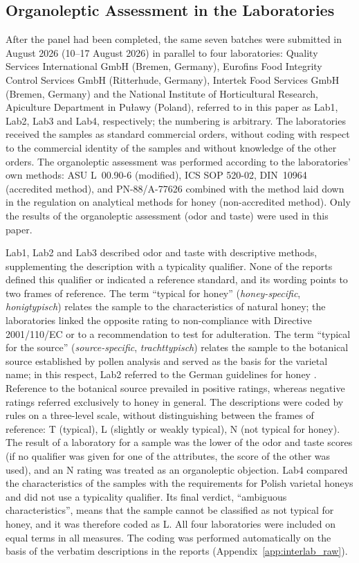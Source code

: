\subsection{Organoleptic Assessment in the Laboratories}
\label{sub:interlab_methods}

After the panel had been completed, the same seven batches were submitted in
August 2026 (10--17 August 2026) in parallel to four laboratories: Quality
Services International GmbH (Bremen, Germany), Eurofins Food Integrity Control
Services GmbH (Ritterhude, Germany), Intertek Food Services GmbH (Bremen,
Germany) and the National Institute of Horticultural Research, Apiculture
Department in Puławy (Poland), referred to in this paper as Lab1, Lab2, Lab3
and Lab4, respectively; the numbering is arbitrary. The laboratories received
the samples as standard commercial orders, without coding with respect to the
commercial identity of the samples and without knowledge of the other orders.
The organoleptic assessment was performed according to the laboratories' own
methods: ASU L~00.90-6 (modified), ICS SOP 520-02, DIN~10964 (accredited
method), and PN-88/A-77626 \cite{PN8877626} combined with the method laid down
in the regulation on analytical methods for honey \cite{RozporzadzenieMRiRW2009}
(non-accredited method). Only the results of the organoleptic assessment (odor
and taste) were used in this paper.

Lab1, Lab2 and Lab3 described odor and taste with descriptive methods,
supplementing the description with a typicality qualifier. None of the reports
defined this qualifier or indicated a reference standard, and its wording
points to two frames of reference. The term ``typical for honey''
(\textit{honey-specific}, \textit{honigtypisch}) relates the sample to the
characteristics of natural honey; the laboratories linked the opposite rating
to non-compliance with Directive 2001/110/EC or to a recommendation to test
for adulteration. The term ``typical for the source''
(\textit{source-specific}, \textit{trachttypisch}) relates the sample to the
botanical source established by pollen analysis and served as the basis for
the varietal name; in this respect, Lab2 referred to the German guidelines for
honey \cite{BMEL2011Honig}. Reference to the botanical source prevailed in
positive ratings, whereas negative ratings referred exclusively to honey in
general. The descriptions were coded by rules on a three-level scale, without
distinguishing between the frames of reference: T (typical), L (slightly or
weakly typical), N (not typical for honey). The result of a laboratory for a
sample was the lower of the odor and taste scores (if no qualifier was given
for one of the attributes, the score of the other was used), and an N rating
was treated as an organoleptic objection. Lab4 compared the characteristics
of the samples with the requirements for Polish varietal honeys and did not use
a typicality qualifier. Its final verdict, ``ambiguous characteristics'',
means that the sample cannot be classified as not typical for honey, and it
was therefore coded as L. All four laboratories were included on equal terms
in all measures. The coding was performed automatically on the basis of the
verbatim descriptions in the reports (Appendix~\ref{app:interlab_raw}).

